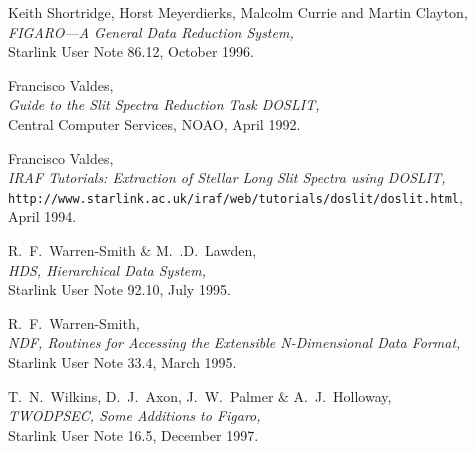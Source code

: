 \documentclass[twoside,11pt]{article}
\newcommand{\htmladdnormallink}[2]{#1}
\newcommand{\xref}[3]{#1}
\newcommand{\scspec}[2]{#1}
\newcommand{\scspec}[2]{#2}
\begin{document}
\begin{thebibliography}{999}
 Keith Shortridge, Horst Meyerdierks, Malcolm Currie and
      Martin Clayton,\\
      {\sl \xref{FIGARO\scspec{---}{ - }A General Data Reduction System}
      {sun86}{},}\\
      Starlink User Note 86.12, October 1996.

 Francisco Valdes,\\
      {\sl
      \htmladdnormallink{Guide to the Slit Spectra Reduction Task DOSLIT}
      {ftp://starlink-ftp.rl.ac.uk/pub/iraf/iraf/docs/doslit.ps.Z},}\\
      Central Computer Services, NOAO, April 1992.

 Francisco Valdes,\\
      {\sl
      \htmladdnormallink{IRAF Tutorials: Extraction of Stellar Long Slit
      Spectra using DOSLIT}
      {http://www.starlink.ac.uk/iraf/web/tutorials/doslit/doslit.html},}\\
      {\tt http://www.starlink.ac.uk/iraf/web/tutorials/doslit/doslit.html},
      \\
      April 1994.

 R.~F.~Warren-Smith \& M.~.D.~Lawden,\\
      {\sl \xref{HDS, Hierarchical Data System}{sun92}{},}\\
      Starlink User Note 92.10, July 1995.

 R.~F.~Warren-Smith,\\
      {\sl \xref{NDF, Routines for Accessing the Extensible N-Dimensional
      Data Format}{sun33}{},}\\
      Starlink User Note 33.4, March 1995.

 T.~N.~Wilkins, D.~J.~Axon, J.~W.~Palmer \& A.~J.~Holloway,\\
      {\sl \xref{TWODPSEC, Some Additions to Figaro}{sun16}{},}\\
      Starlink User Note 16.5, December  1997.

\end{thebibliography}
\end{document}
